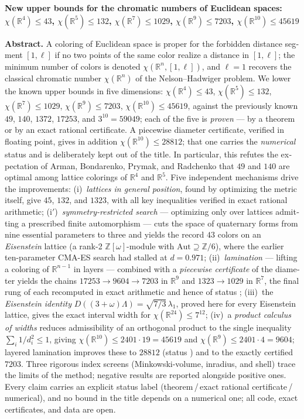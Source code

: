 \documentclass[11pt]{article}
\theoremstyle{definition}
\theoremstyle{remark}
\newcommand{\R}{\mathbb{R}}
\newcommand{\Z}{\mathbb{Z}}
\newcommand{\cyrbadge}[1]{{\fontencoding{T2A}\selectfont #1}}
\newcommand{\stC}{\textcolor{RoyalBlue}{\textbf{\cyrbadge{[С]}}}}       %
\newcommand{\stN}{\textcolor{BurntOrange}{\textbf{\cyrbadge{[Ч]}}}}     %
\begin{document}
\begin{otherlanguage}{english}
\begin{center}
{\bfseries New upper bounds for the chromatic numbers of Euclidean spaces:\\
$\chi(\R^4)\le43$, $\chi(\R^5)\le132$, $\chi(\R^7)\le1029$,
$\chi(\R^9)\le7203$, $\chi(\R^{10})\le45619$}
\end{center}

\noindent\textbf{Abstract.}
A coloring of Euclidean space is proper for the forbidden distance segment
$[1,\ell]$ if no two points of the same color realize a distance in
$[1,\ell]$; the minimum number of colors is denoted
$\chi(\R^n,[1,\ell])$, and $\ell=1$ recovers the classical chromatic number
$\chi(\R^n)$ of the Nelson--Hadwiger problem. We lower the known upper bounds
in five dimensions: $\chi(\R^4)\le43$, $\chi(\R^5)\le132$,
$\chi(\R^7)\le1029$, $\chi(\R^9)\le7203$, $\chi(\R^{10})\le45619$, against
the previously known $49$, $140$, $1372$, $17253$, and $3^{10}=59049$; each of
the five is \emph{proven} --- by a theorem or by an exact rational certificate.
A piecewise diameter certificate, verified in floating point, gives in addition
$\chi(\R^{10})\le28812$; that one carries the
\emph{numerical} status \stN{} and is deliberately kept out of the title. In
particular, this refutes the expectation of Arman, Bondarenko, Prymak, and
Radchenko that $49$ and $140$ are optimal among lattice colorings of $\R^4$
and $\R^5$. Five independent mechanisms drive the improvements:
(i)~\emph{lattices in general position}, found by optimizing the metric
itself, give $45$, $132$, and $1323$, with all key inequalities verified in
exact rational arithmetic; (i$'$)~\emph{symmetry-restricted search} ---
optimizing only over lattices admitting a prescribed finite automorphism ---
cuts the space of quaternary forms from nine essential parameters to three and
yields the record $43$ colors on an \emph{Eisenstein} lattice (a rank-2
$\Z[\omega]$-module with $\mathrm{Aut}\supseteq\Z/6$), where the earlier
ten-parameter CMA-ES search had stalled at $d=0.971$; (ii)~\emph{lamination} --- lifting a coloring of
$\R^{n-1}$ in layers --- combined with a \emph{piecewise certificate} of the
diameter yields the chains $17253\to9604\to7203$ in $\R^9$ and
$1323\to1029$ in $\R^7$, the final rung of each recomputed in exact arithmetic
and hence of status \stC; (iii)~the \emph{Eisenstein identity}
$D((3+\omega)\Lambda)=\sqrt{7/3}\,\lambda_1$, proved here for every Eisenstein
lattice, gives the exact interval width for $\chi(\R^{24})\le7^{12}$; (iv)~a \emph{product calculus of widths}
reduces admissibility of an orthogonal product to the single inequality
$\sum_i 1/d_i^2\le1$, giving $\chi(\R^{10})\le2401\cdot19=45619$ and
$\chi(\R^9)\le2401\cdot4=9604$; layered lamination improves these to $28812$
(status \stN) and to the exactly certified $7203$. Three rigorous index screens
(Minkowski-volume, inradius, and shell) trace the limits of the method; negative
results are reported alongside positive ones. Every claim carries an
explicit status label (theorem\,/\,exact rational certificate\,/\,numerical),
and no bound in the title depends on a numerical one;
all code, exact certificates, and data are open.


\end{otherlanguage}
\end{document}
